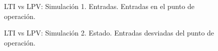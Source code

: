 \documentclass[a4paper, 10pt, onecolumn,journal]{ieeeconf}
\begin{document}
\begin{figure}[H]
	\centering
	\begin{adjustbox}{scale=0.6,max width=\columnwidth}
	\end{adjustbox}
	\caption{LTI vs LPV: Simulación 1. Entradas. Entradas en el punto de operación.}
	\label{simulación 1 entradas}
\end{figure}

\begin{figure}[H]
	\centering
	\begin{adjustbox}{max width=\columnwidth}
	\end{adjustbox}
	\caption{LTI vs LPV: Simulación 2. Estado. Entradas desviadas del punto de operación.}
	\label{simulación 2 estado}
\end{figure}
\end{document}
